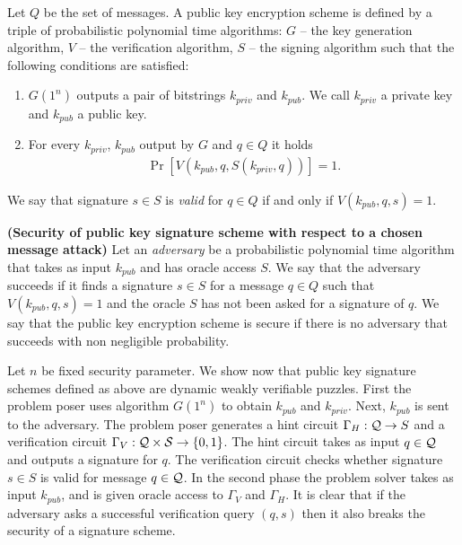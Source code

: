 \documentclass[11pt,a4paper,titlepage]{memoir}
\begin{document}
\begin{definition}
Let $Q$ be the set of messages. A public key encryption scheme is defined by a triple of probabilistic polynomial time algorithms:
$G$ -- the key generation algorithm, $V$ -- the verification algorithm, $S$ -- the signing algorithm such that the following conditions are satisfied:
\begin{enumerate}[-]
  \item $G(1^n)$ outputs a pair of bitstrings $k_{priv}$ and $k_{pub}$. We call $k_{priv}$ a private key and $k_{pub}$ a public key.
  \item For every $k_{priv}$, $k_{pub}$ output by $G$ and $q \in Q$ it holds
    \begin{align*}
      \Pr[V(k_{pub}, q, S(k_{priv}, q))] = 1.
    \end{align*}
\end{enumerate}
\end{definition}
We say that signature $s \in S$ is \textit{valid} for $q \in Q$ if and only if $V(k_{pub}, q, s) = 1$.
%
%
\begin{definition}\textbf{(Security of public key signature scheme with respect to a chosen message attack)}
Let an \textit{adversary} be a probabilistic polynomial time algorithm that takes as input $k_{pub}$ and has oracle access $S$.
We say that the adversary succeeds if it finds a signature $s \in S$ for a message $q \in Q$ such that $V(k_{pub}, q, s) = 1$
and the oracle $S$ has not been asked for a signature of $q$.
We say that the public key encryption scheme is secure if there is no adversary that succeeds with non negligible probability.
\end{definition}

Let $n$ be fixed security parameter.
We show now that public key signature schemes defined as above are dynamic weakly verifiable puzzles.
First the problem poser uses algorithm $G(1^n)$ to obtain $k_{pub}$ and $k_{priv}$.
Next, $k_{pub}$ is sent to the adversary.
The problem poser generates a hint circuit $\Gamma_H : \mathcal{Q} \rightarrow S$ and a verification circuit $\Gamma_V : \mathcal{Q} \times \mathcal{S} \rightarrow \{0,1\}$.
The hint circuit takes as input $q \in \mathcal{Q}$ and outputs a signature for $q$. The verification circuit checks whether
signature $s \in S$ is valid for message $q \in \mathcal{Q}$.
In the second phase the problem solver takes as input $k_{pub}$, and is given oracle access to $\Gamma_V$ and $\Gamma_H$.
It is clear that if the adversary asks a successful verification query $(q,s)$ then it also breaks the security of a signature scheme.
\end{document}
